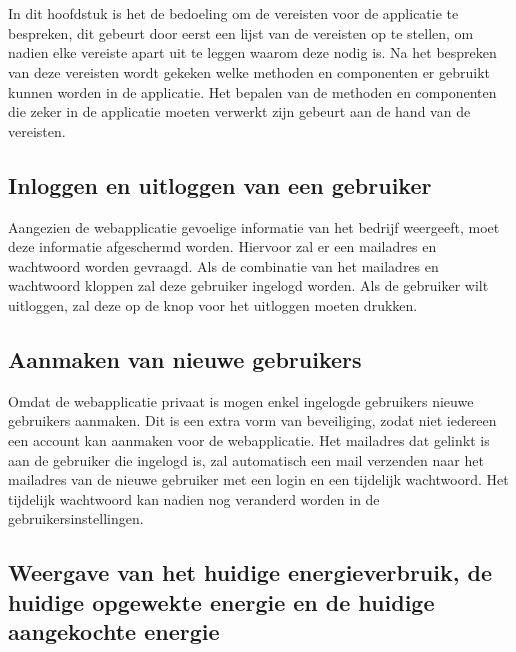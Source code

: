 \chapter{}%
\label{ch:analyse-van-de-vereisten}

In dit hoofdstuk is het de bedoeling om de vereisten voor de applicatie te bespreken, dit gebeurt door eerst een lijst van de vereisten op te stellen, om nadien elke vereiste apart uit te leggen waarom deze nodig is. Na het bespreken van deze vereisten wordt gekeken welke methoden en componenten er gebruikt kunnen worden in de applicatie. Het bepalen van de methoden en componenten die zeker in de applicatie moeten verwerkt zijn gebeurt aan de hand van de vereisten.

\section{Inloggen en uitloggen van een gebruiker}
\label{sec:analyse-vereisten-inloggen-en-uitloggen-van-een-gebruiker}

Aangezien de webapplicatie gevoelige informatie van het bedrijf weergeeft, moet deze informatie afgeschermd worden. Hiervoor zal er een mailadres en wachtwoord worden gevraagd. Als de combinatie van het mailadres en wachtwoord kloppen zal deze gebruiker ingelogd worden. Als de gebruiker wilt uitloggen, zal deze op de knop voor het uitloggen moeten drukken.

\section{Aanmaken van nieuwe gebruikers}
\label{sec:analyse-vereisten-aanmaken-van-nieuwe-gebruikers}

Omdat de webapplicatie privaat is mogen enkel ingelogde gebruikers nieuwe gebruikers aanmaken. Dit is een extra vorm van beveiliging, zodat niet iedereen een account kan aanmaken voor de webapplicatie. Het mailadres dat gelinkt is aan de gebruiker die ingelogd is, zal automatisch een mail verzenden naar het mailadres van de nieuwe gebruiker met een login en een tijdelijk wachtwoord. Het tijdelijk wachtwoord kan nadien nog veranderd worden in de gebruikersinstellingen.

\section{Weergave van het huidige energieverbruik, de huidige opgewekte energie en de huidige aangekochte energie}
\label{sec:analyse-vereisten-weergave-van-het-energieverbruik}

